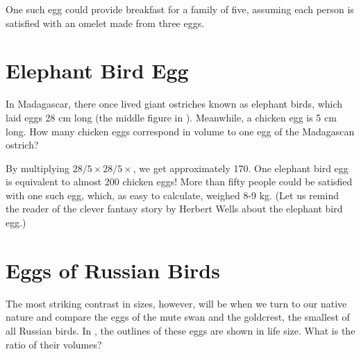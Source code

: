 One such egg could provide breakfast for a family of five, assuming each person is satisfied with an omelet made from three eggs.

\section{Elephant Bird Egg}
\label{sec-11.7}


\ques In Madagascar, there once lived giant ostriches known as elephant birds, which laid eggs 28 cm long (the middle figure in ). Meanwhile, a chicken egg is 5 cm long. How many chicken eggs correspond in volume to one egg of the Madagascan ostrich?


\ans By multiplying \( 28/5 \times 28/5 \times \), we get approximately 170. One elephant bird egg is equivalent to almost 200 chicken eggs! More than fifty people could be satisfied with one such egg, which, as easy to calculate, weighed 8-9 kg. (Let us remind the reader of the clever fantasy story by Herbert Wells about the elephant bird egg.)

\clearpage

\section{Eggs of Russian Birds}
\label{sec-11.8}



The most striking contrast in sizes, however, will be when we turn to our native nature and compare the eggs of the mute swan and the goldcrest, the smallest of all Russian birds. In , the outlines of these eggs are shown in life size. What is the ratio of their volumes?

